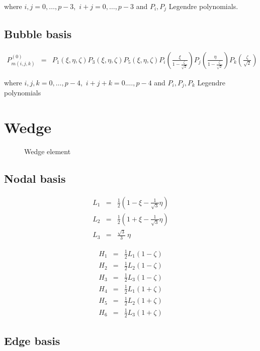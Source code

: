 \noindent where $i,j=0,\ldots,p-3$,\ $i+j=0,\ldots,p-3$ and $P_i,P_j$
Legendre polynomials.

\subsection{Bubble basis} 

\begin{eqnarray*}
P_{m(i,j,k)}^{(0)}&=&P_1(\xi,\eta,\zeta)P_3(\xi,\eta,\zeta)
P_5(\xi,\eta,\zeta)P_i(\frac{\xi}{1-\frac{\zeta}{\sqrt{2}}})
P_j(\frac{\eta}{1-\frac{\zeta}{\sqrt{2}}})P_k(\frac{\zeta}{\sqrt{2}})
\end{eqnarray*}

\noindent where $i,j,k=0,\ldots,p-4$,\ $i+j+k=0.\ldots,p-4$ and
$P_i,P_j,P_k$ Legendre polynomials

\section{Wedge}

\begin{figure}[tbhp]
\begin{center}

\caption{Wedge element}
\end{center}
\end{figure}

\subsection{Nodal basis}

\begin{eqnarray*}
L_1&=&\frac{1}{2}(1-\xi-\frac{1}{\sqrt{3}}\eta) \\
L_2&=&\frac{1}{2}(1+\xi-\frac{1}{\sqrt{3}}\eta) \\
L_3&=&\frac{\sqrt{3}}{3}\ \eta 
\end{eqnarray*}

\begin{eqnarray*}
H_1&=&\frac{1}{2}L_1(1-\zeta) \\
H_2&=&\frac{1}{2}L_2(1-\zeta) \\
H_3&=&\frac{1}{2}L_3(1-\zeta) \\
H_4&=&\frac{1}{2}L_1(1+\zeta) \\
H_5&=&\frac{1}{2}L_2(1+\zeta) \\
H_6&=&\frac{1}{2}L_3(1+\zeta)
\end{eqnarray*}

\subsection{Edge basis}

